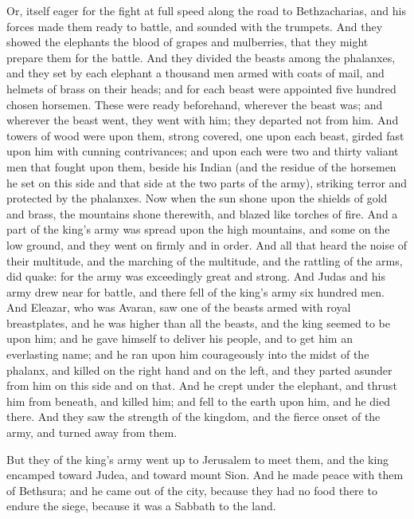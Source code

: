 {{Or,
itself eager for the fight
} at full speed along the road to Bethzacharias, and his forces made them ready to battle, and sounded with the trumpets.
And they showed the elephants the blood of grapes and mulberries, that they might prepare them for the battle.
And they divided the beasts among the phalanxes, and they set by each elephant a thousand men armed with coats of mail, and helmets of brass on their heads; and for each beast were appointed five hundred chosen horsemen.
These were ready beforehand, wherever the beast was; and wherever the beast went, they went with him; they departed not from him.
And towers of wood were upon them, strong
{} covered, one upon each beast, girded fast upon him with cunning contrivances; and upon each
{} were two and thirty valiant men that fought upon them, beside his Indian
(and the residue of the horsemen he set on this side and that side at the two parts of the army), striking terror
{} and protected by the phalanxes.
Now when the sun shone upon the shields of gold and brass, the mountains shone therewith, and blazed like torches of fire.
And a part of the king’s army was spread upon the high mountains, and some on the low ground, and they went on firmly and in order.
And all that heard the noise of their multitude, and the marching of the multitude, and the rattling of the arms, did quake: for the army was exceedingly great and strong.
And Judas and his army drew near for battle, and there fell of the king’s army six hundred men.
And Eleazar, who was
{} Avaran, saw one of the beasts armed with royal breastplates, and he was higher than all the beasts, and the king seemed to be upon him;
and he gave himself to deliver his people, and to get him an everlasting name;
and he ran upon him courageously into the midst of the phalanx, and killed on the right hand and on the left, and they parted asunder from him on this side and on that.
And he crept under the elephant, and thrust him from beneath, and killed him; and
{} fell to the earth upon him, and he died there.
And they saw the strength of the kingdom, and the fierce onset of the army, and turned away from them.
\par }{\PP {}But they of the king’s army went up to Jerusalem to meet them, and the king encamped toward Judea, and toward mount Sion.
And he made peace with them of Bethsura; and he came out of the city, because they had no food there to endure the siege, because it was a Sabbath to the land.
}

